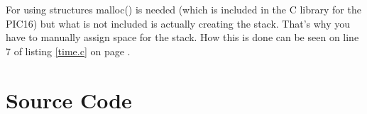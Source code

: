 \documentclass[11pt]{article}
\begin{document}
For using structures malloc() is needed (which is included in the C library for the PIC16) but what is not included is actually creating the stack. That's why you have to manually assign space for the stack. How this is done can be seen on line 7 of listing \ref{time.c} on page \pageref{time.c}.

\appendix

\section{Source Code}






\end{document}

